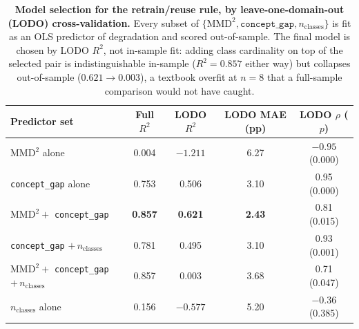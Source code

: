 \begin{table}[htbp]
\centering
\small
\caption{\textbf{Model selection for the retrain/reuse rule, by leave-one-domain-out
(LODO) cross-validation.} Every subset of $\{\mathrm{MMD}^2, \texttt{concept\_gap},
n_{\mathrm{classes}}\}$ is fit as an OLS predictor of degradation and scored
out-of-sample. The final model is chosen by LODO $R^2$, not in-sample fit: adding
class cardinality on top of the selected pair is indistinguishable in-sample
($R^2=0.857$ either way) but collapses out-of-sample ($0.621 \rightarrow 0.003$),
a textbook overfit at $n=8$ that a full-sample comparison would not have caught.}
\label{tab:degradation_regressor}
\setlength{\tabcolsep}{6pt}
\begin{tabular}{lcccc}
\toprule
\textbf{Predictor set} & \textbf{Full $R^2$} & \textbf{LODO $R^2$} & \textbf{LODO MAE (pp)} & \textbf{LODO $\rho$ ($p$)} \\
\midrule
$\mathrm{MMD}^2$ alone                                   & 0.004 & $-1.211$ & 6.27 & $-0.95$ (0.000) \\
\texttt{concept\_gap} alone                              & 0.753 & 0.506 & 3.10 & 0.95 (0.000) \\
\rowcolor{gray!12}
$\mathrm{MMD}^2 + $ \texttt{concept\_gap}                & \bf 0.857 & \bf 0.621 & \bf 2.43 & 0.81 (0.015) \\
\texttt{concept\_gap} $+\, n_{\mathrm{classes}}$         & 0.781 & 0.495 & 3.10 & 0.93 (0.001) \\
$\mathrm{MMD}^2 + $ \texttt{concept\_gap} $+\, n_{\mathrm{classes}}$ & 0.857 & 0.003 & 3.68 & 0.71 (0.047) \\
$n_{\mathrm{classes}}$ alone                             & 0.156 & $-0.577$ & 5.20 & $-0.36$ (0.385) \\
\bottomrule
\end{tabular}
\end{table}

